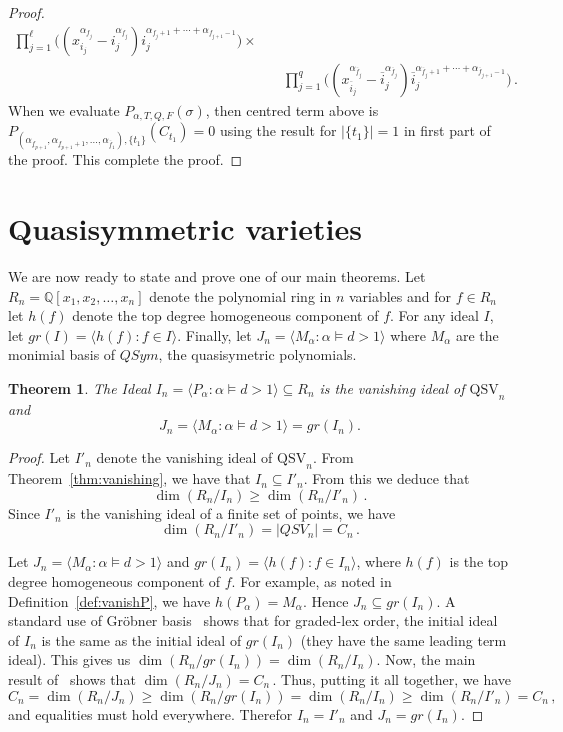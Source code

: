 \documentclass[12pt]{amsart}
\newtheorem{thm}[equation]{Theorem}
\theoremstyle{definition}
\theoremstyle{remark}
\numberwithin{equation}{section}
\newcommand{\QQ}{\mathbb{Q}}
\newcommand{\QSV}{\mathrm{QSV}}
\begin{document}
\begin{proof}
\begin{align*}
		\prod_{j=1}^\ell 
	     	\Big( (x_{i_j}^{\alpha_{f_j}}- i_j^{\alpha_{f_j }})  i_j^{\alpha_{f_j +1}+\cdots+\alpha_{f_{j +1}-1}} \Big)\times\\
		&\quad\prod_{j=1}^q 
	     	\Big( (x_{\overline{i}_j}^{\alpha_{\overline{f}_j}}-\overline{i}_j^{\alpha_{\overline{f}_j }})  \overline{i}_j^{\alpha_{\overline{f}_j +1}+\cdots+\alpha_{\overline{f}_{j +1}-1}} \Big) \,.
\end{align*}
When we evaluate $P_{\alpha,T,Q,F}(\sigma)$, then centred term above is $P_{(\alpha_{\underline{f}_{p+1}}, \alpha_{\underline{f}_{p+1}+1} , \ldots, \alpha_{\overline{f}_1} ),\{t_1\}}(C_{t_1})=0$ using the result for $|\{t_1\}|=1$ in first part of the proof. This complete the proof.
\end{proof}


\section{Quasisymmetric varieties}
\label{sec:finalthm}


We are now ready to state and prove one of our main theorems. Let $R_n=\QQ[x_1,x_2,\ldots,x_n]$ denote the polynomial ring in $n$ variables and for $f\in R_n$ let $h(f)$ denote
the top degree homogeneous component of $f$. For any ideal $I$, let $gr(I)=\langle h(f) : f\in I \rangle$. Finally, let $J_n=\langle M_\alpha : \alpha\models d>1 \rangle$ where $M_\alpha$ are the monimial basis of $QSym$, the quasisymetric  polynomials.

\begin{thm}\label{thm:vanishingQSV} The Ideal $I_n=\langle P_\alpha : \alpha\models d>1\rangle\subseteq R_n$ is the vanishing ideal of $\QSV_n$ and 
 $$J_n=\langle M_\alpha : \alpha\models d>1\rangle = gr(I_n).$$
 \end{thm}

\begin{proof}
	Let $I'_n$ denote the vanishing ideal of $\QSV_n$. From Theorem~\ref{thm:vanishing}, we have that $I_n\subseteq I'_n$. From this we deduce that
	 $$ \dim(R_n/I_n) \ge \dim(R_n/I'_n)\,.$$
	 Since $I'_n$ is the vanishing ideal of a finite set of points, we have 
	 $$ \dim(R_n/I'_n)=|QSV_n|=C_n\,.$$
	 
	Let $J_n=\langle M_\alpha : \alpha\models d>1\rangle$ and $gr(I_n)=\langle h(f) : f\in I_n \rangle$, where $h(f)$ is the top degree homogeneous component of $f$.
	For example, as noted in Definition~\ref{def:vanishP}, we have $h(P_\alpha)=M_\alpha$. Hence $J_n\subseteq gr(I_n)$. 
	A standard use of Gr\"obner basis~\cite{CLO} shows that for graded-lex order, the initial ideal of $I_n$ is the same as the initial ideal of $gr(I_n)$ (they have the same leading term ideal).
	This gives us $\dim(R_n/gr(I_n)) =  \dim(R_n/I_n)$. Now, the main result of~\cite{ABB} shows that
	$ \dim(R_n/J_n)=C_n\,.$
	Thus, putting it all together, we have 
	$$C_n= \dim(R_n/J_n) \ge \dim(R_n/gr(I_n)) =  \dim(R_n/I_n) \ge \dim(R_n/I'_n) =C_n\,,$$
	and equalities must hold everywhere. Therefor $I_n=I'_n$ and $J_n=gr(I_n)$.
\end{proof}
\end{document}
